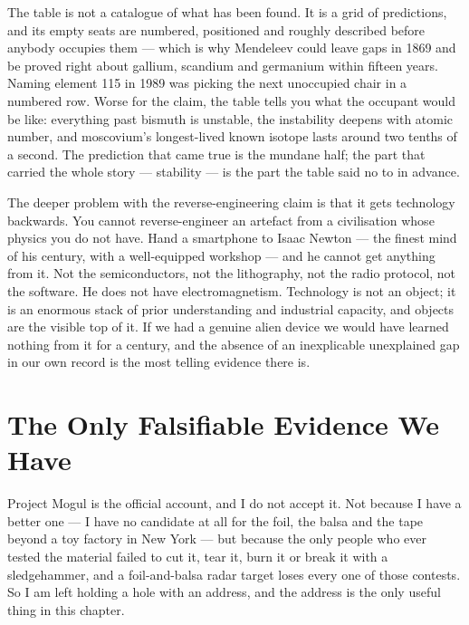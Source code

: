 The table is not a catalogue of what has been found. It is a grid of predictions, and its empty
seats are numbered, positioned and roughly described before anybody occupies them --- which is why
Mendeleev could leave gaps in 1869 and be proved right about gallium, scandium and germanium within
fifteen years. Naming element 115 in 1989 was picking the next unoccupied chair in a numbered row.
Worse for the claim, the table tells you what the occupant would be like: everything past bismuth
is unstable, the instability deepens with atomic number, and moscovium's longest-lived known isotope
lasts around two tenths of a second.  The prediction that came true is the mundane half; the part that carried the
whole story --- stability --- is the part the table said no to in advance.

\begin{funfact}
The deeper problem with the reverse-engineering claim is that it gets technology backwards. You
cannot reverse-engineer an artefact from a civilisation whose physics you do not have. Hand a
smartphone to Isaac Newton --- the finest mind of his century, with a well-equipped workshop ---
and he cannot get anything from it. Not the semiconductors, not the lithography, not the radio
protocol, not the software. He does not have electromagnetism. Technology is not an object; it is
an enormous stack of prior understanding and industrial capacity, and objects are the visible top
of it. If we had a genuine alien device we would have learned nothing from it for a century, and
the absence of an inexplicable unexplained gap in our own record is the most telling evidence
there is.
\end{funfact}

\section{The Only Falsifiable Evidence We Have}\label{sec:whereistand}

Project Mogul is the official account, and I do not accept it.
Not because I have a better one --- I have no candidate at all for the foil, the balsa and the tape
beyond a toy factory in New York --- but because the only people who ever tested the material failed
to cut it, tear it, burn it or break it with a sledgehammer, and a foil-and-balsa radar target loses
every one of those contests.  So I am left holding a hole with an address, and the
address is the only useful thing in this chapter. 

